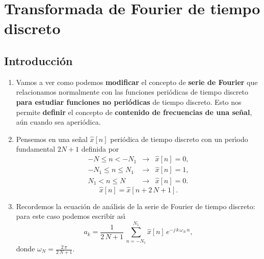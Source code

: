 \chapter{Transformada de Fourier de tiempo discreto}

\section{Introducci\'{o}n}

\begin{enumerate}

\item   Vamos a ver como podemos \textbf{modificar} el concepto de \textbf{serie de Fourier} que 
relacionamos normalmente con las funciones peri\'{o}dicas de tiempo discreto 
\textbf{para estudiar funciones no peri\'{o}dicas} de tiempo discreto. 
Esto nos permite \textbf{definir} el concepto de \textbf{contenido de frecuencias de una se\~{n}al}, 
a\'{u}n cuando sea aperi\'{o}dica.

\item   Pensemos en una se\~{n}al $\hat{x}\left[ n\right]$ peri\'{o}dica de tiempo discreto con un
        per\'{\i}odo fundamental $2 N + 1$ definida por
        \begin{equation}
                        \begin{array}{ccc}
                                -N \leq n < -N_{1} &\rightarrow& \hat{x}[n] = 0, \\
                                -N_{1} \leq n \leq N_{1} & \rightarrow& \hat{x}[n] = 1, \\
                                N_{1} < n \leq N &\rightarrow& \hat{x}[n] = 0.
                        \end{array}
        \end{equation}
        \begin{equation}
                \hat{x} \left[ n\right] = \hat{x} \left[n + 2 \, N + 1\right].
        \end{equation}

\item   Recordemos la ecuaci\'{o}n de an\'{a}lisis de la serie de Fourier de tiempo discreto: 
  para este caso podemos escribir as\'{\i} 
        \begin{equation}
                a_{k}=
                        \frac{1}{2 \, N + 1} \, \sum_{n=-N_{1}}^{N_{1}} \hat{x}\left[ n\right] \, e^{-j \, k \, \omega_{N} \, n},
        \end{equation}
donde $\omega_{N} = \frac{2 \, \pi}{2 \, N + 1}$.
        

\end{enumerate}
